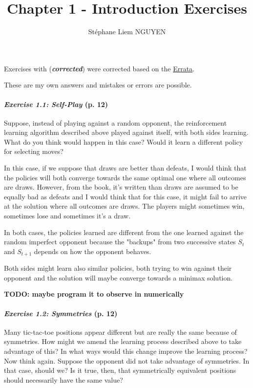 \documentclass[10pt,a4paper]{article}
\title{Chapter 1 - Introduction Exercises}
\author{Stéphane Liem NGUYEN}
\begin{document}
\maketitle

Exercises with (\textbf{\textit{corrected}}) were corrected based on the \href{http://incompleteideas.net/book/errata.html}{Errata}.

These are my own answers and mistakes or errors are possible.

\paragraph{\textit{Exercise 1.1: Self-Play} (p. 12)}  Suppose, instead of playing against a random opponent, the reinforcement learning algorithm described above played against itself, with both sides learning. What do you think would happen in this case? Would it learn a different policy for selecting moves?

\bigskip
In this case, if we suppose that draws are better than defeats, I would think that the policies will both converge towards the same optimal one where all outcomes are draws. However, from the book, it's written than draws are assumed to be equally bad as defeats and I would think that for this case, it might fail to arrive at the solution where all outcomes are draws. The players might sometimes win, sometimes lose and sometimes it's a draw.

In both cases, the policies learned are different from the one learned against the random imperfect opponent because the "backups" from two successive states $S_t$ and $S_{t+1}$ depends on how the opponent behaves.

Both sides might learn also similar policies, both trying to win against their opponent and the solution will maybe converge towards a minimax solution.


\textbf{TODO: maybe program it to observe in numerically}

\paragraph{\textit{Exercise 1.2: Symmetries} (p. 12)} Many tic-tac-toe positions appear different but are really the same because of symmetries. How might we amend the learning process described above to take advantage of this? In what ways would this change improve the learning process? Now think again. Suppose the opponent did not take advantage of symmetries. In that case, should we? Is it true, then, that symmetrically equivalent positions should necessarily have the same value?
\end{document}
